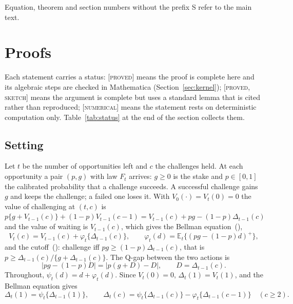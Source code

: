 \documentclass[aoas]{imsart}
\theoremstyle{plain}
\theoremstyle{definition}
\newcommand{\E}{\mathbb{E}}
\newcommand{\status}[1]{\textup{[\textsc{#1}]}}
\begin{document}
Equation, theorem and section numbers without the prefix S refer to the main text.

\section{Proofs}\label{sec:proofs}

Each statement carries a status: \status{proved} means the proof is complete here and its algebraic steps are
checked in Mathematica (Section~\ref{sec:kernel}); \status{proved, sketch} means the argument is complete but uses a
standard lemma that is cited rather than reproduced; \status{numerical} means the statement rests on deterministic
computation only. Table~\ref{tab:status} at the end of the section collects them.

\subsection{Setting}\label{sec:setting}
Let $t$ be the number of opportunities left and $c$ the challenges held. At each opportunity a pair $(p,g)$ with law
$F_t$ arrives: $g\ge0$ is the stake and $p\in[0,1]$ the calibrated probability that a challenge succeeds. A successful
challenge gains $g$ and keeps the challenge; a failed one loses it. With $V_0(\cdot)=V_t(0)=0$ the value of
challenging at $(t,c)$ is $p\{g+V_{t-1}(c)\}+(1-p)V_{t-1}(c-1)=V_{t-1}(c)+pg-(1-p)\Delta_{t-1}(c)$ and the value of
waiting is $V_{t-1}(c)$, which gives the Bellman equation~(),
\[ V_t(c)=V_{t-1}(c)+\varphi_t\{\Delta_{t-1}(c)\},\qquad \varphi_t(d)=\E_t\{(pg-(1-p)d)^+\}, \]
and the cutoff~(): challenge iff $pg\ge(1-p)\Delta_{t-1}(c)$, that is
$p\ge\Delta_{t-1}(c)/\{g+\Delta_{t-1}(c)\}$. The Q-gap between the two actions is
\begin{equation}\label{eq:qgap}
|pg-(1-p)D| = |p(g+D)-D|, \qquad D=\Delta_{t-1}(c).
\end{equation}
Throughout, $\psi_t(d)=d+\varphi_t(d)$. Since $V_t(0)=0$, $\Delta_t(1)=V_t(1)$, and the Bellman equation gives
\begin{equation}\label{eq:delta}
\Delta_t(1)=\psi_t\{\Delta_{t-1}(1)\},\qquad \Delta_t(c)=\psi_t\{\Delta_{t-1}(c)\}-\varphi_t\{\Delta_{t-1}(c-1)\}\quad(c\ge2).
\end{equation}
\end{document}
